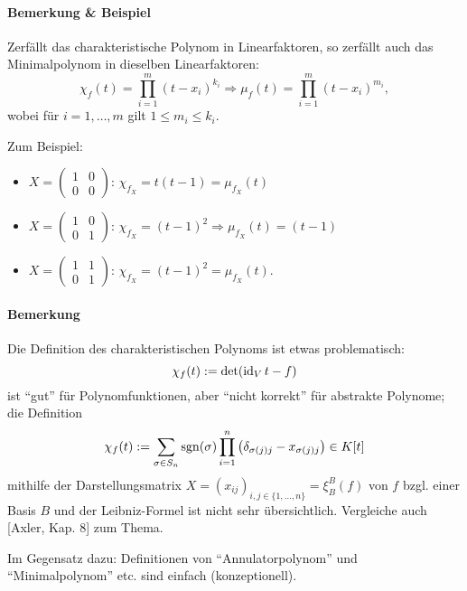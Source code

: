 \paragraph{Bemerkung \& Beispiel}
	Zerfällt das charakteristische Polynom in Linearfaktoren, so zerfällt auch das Minimalpolynom in dieselben Linearfaktoren:
		\[ \chi_f(t)= \prod_{i=1}^{m}(t-x_i)^{k_i} \Rightarrow \mu_f(t) = \prod_{i=1}^{m}(t-x_i)^{m_i}, \]
	wobei für $ i= 1,\dots,m $ gilt $ 1\leq m_i\leq k_i $.
	
	Zum Beispiel: 
		\begin{itemize}
			\item $ X = \begin{pmatrix}
			1&0\\0&0
			\end{pmatrix} $: $ \chi_{f_X} = t(t-1) = \mu_{f_X}(t)$
			\item $ X = \begin{pmatrix}
			1&0\\0&1
			\end{pmatrix} $: $ \chi_{f_X} = (t-1)^2 \Rightarrow \mu_{f_X}(t) = (t-1) $
			\item $ X = \begin{pmatrix}
			1&1\\0&1
			\end{pmatrix} $: $ \chi_{f_X} = (t-1)^2 = \mu_{f_X}(t)$.
		\end{itemize}

\paragraph{Bemerkung}
	Die Definition des charakteristischen Polynoms ist etwas problematisch:
		\[ \chi_f(t) := \det (\operatorname{id}_Vt-f) \]
	ist "`gut"' für Polynomfunktionen, aber "`nicht korrekt"' für abstrakte Polynome; die Definition 
		\[ \chi_f(t) := \sum_{\sigma\in S_n}\operatorname{sgn}(\sigma)\prod_{i=1}^{n}\left(\delta_{\sigma(j)j}-x_{\sigma(j)j} \right)\in K[t] \]
	mithilfe der Darstellungsmatrix $ X = (x_{ij})_{i,j\in \{1,\dots,n\}} = \xi_B^B(f) $
	von $ f $ bzgl. einer Basis $ B $ und der Leibniz-Formel ist nicht sehr übersichtlich. Vergleiche auch [Axler, Kap. 8] zum Thema.
	
	Im Gegensatz dazu: Definitionen von "`Annulatorpolynom"' und "`Minimalpolynom"' etc. sind einfach (konzeptionell).
	

